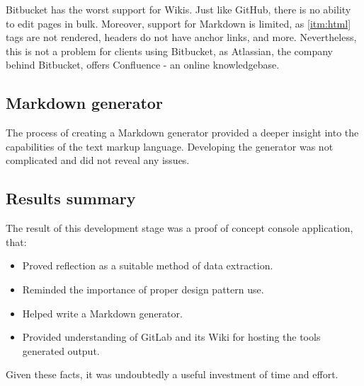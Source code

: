 Bitbucket has the worst support for Wikis.
Just like GitHub, there is no ability to edit pages in bulk.
Moreover, support for Markdown is limited, as \ref{itm:html} tags are not rendered, headers do not have anchor links, and more.
Nevertheless, this is not a problem for clients using Bitbucket, as Atlassian, the company behind Bitbucket, offers Confluence - an online knowledgebase.

\subsection{Markdown generator}

The process of creating a Markdown generator provided a deeper insight into the capabilities of the text markup language. Developing the generator was not complicated and did not reveal any issues.

\subsection{Results summary}

The result of this development stage was a proof of concept console application, that:
\begin{itemize}
    \item Proved reflection as a suitable method of data extraction.
    \item Reminded the importance of proper design pattern use.
    \item Helped write a Markdown generator.
    \item Provided understanding of GitLab and its Wiki for hosting the tools generated output.
\end{itemize}

Given these facts, it was undoubtedly a useful investment of time and effort.